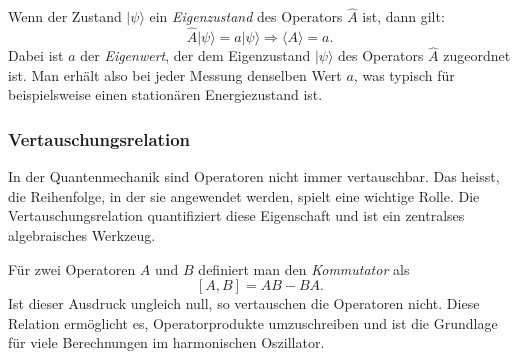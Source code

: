 Wenn der Zustand $|\psi\rangle$ ein \emph{Eigenzustand} des Operators $\hat{A}$ ist, dann gilt:
\begin{equation}
	\hat{A} | \psi \rangle = a | \psi \rangle \Rightarrow \langle A \rangle = a.
\end{equation}
Dabei ist $a$ der \emph{Eigenwert}, der dem Eigenzustand $|\psi\rangle$ des Operators $\hat{A}$ zugeordnet ist. 
%
%
Man erhält also bei jeder Messung denselben Wert $a$, was typisch für beispielsweise einen stationären Energiezustand ist.

\subsubsection{Vertauschungsrelation\label{fourier:subsubsection:Vertauschungsrelation}}
In der Quantenmechanik sind Operatoren nicht immer vertauschbar.
Das heisst, die Reihenfolge, in der sie angewendet werden, spielt eine wichtige Rolle.
Die Vertauschungsrelation quantifiziert diese Eigenschaft und ist ein zentralses algebraisches Werkzeug.

Für zwei Operatoren $A$ und $B$ definiert man den \emph{Kommutator} als
\begin{equation}\label{fourier:equation:Vertauschungsrelation}
	[A, B] = AB - BA.
\end{equation}
%
Ist dieser Ausdruck ungleich null, so vertauschen die Operatoren nicht.
Diese Relation ermöglicht es, Operatorprodukte umzuschreiben und ist die Grundlage für viele Berechnungen im harmonischen Oszillator.

